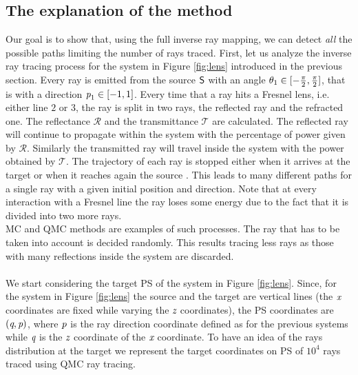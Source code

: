 \subsection{The explanation of the method}
Our goal is to show that, using the full inverse ray mapping, we can detect \textit{all} the possible paths limiting the number of rays traced.
First, let us analyze the inverse ray tracing process for the system in Figure \ref{fig:lens} introduced in the previous section. Every ray is emitted from the source $\textsf{S}$ with an angle $\theta_1\in[-\frac{\pi}{2}, \frac{\pi}{2}]$, that is with a direction $\textit{p}_1\in[-1,1]$. Every time that a ray hits a Fresnel lens, i.e. either line $2$ or $3$, the ray is split in two rays, the reflected ray and the refracted one. The reflectance $\mathcal{R}$ and the transmittance $\mathcal{T}$ are calculated. The reflected ray will continue to propagate within the system with the percentage of power given by $\mathcal{R}$. Similarly the transmitted ray will travel inside the system with the power obtained by $\mathcal{T}$. The trajectory of each ray is stopped either when it arrives at the target  or when it reaches again the source . This leads to many different paths for a single ray with a given initial position and direction. Note that at every interaction with a Fresnel line the ray loses some energy due to the fact that it is divided into two more rays.\\ \indent
MC and QMC methods are examples of such processes. The ray that has to be taken into account is decided randomly. This results tracing less rays as those with many reflections inside the system are discarded. 
\\ \indent 
\\ \indent
We start considering the target PS of the system in Figure \ref{fig:lens}. Since, for the system in Figure \ref{fig:lens} the source and the target are vertical lines (the $\textit{x}$ coordinates are fixed while varying the $\textit{z}$ coordinates), the PS coordinates are $(\textit{q}, \textit{p})$, where  $\textit{p}$ is the ray direction coordinate defined as for the previous systems while $\textit{q}$ is the $\textit{z}$ coordinate of the $\textit{x}$ coordinate. To have an idea of the rays distribution at the target we represent the target coordinates on PS of $10^4$ rays traced using QMC ray tracing. 
